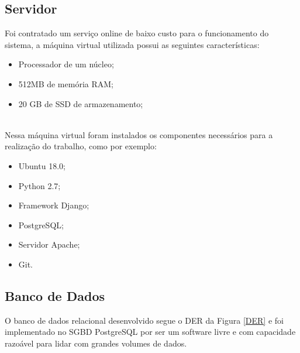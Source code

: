 \subsection{Servidor}
Foi contratado um serviço online de baixo custo para o funcionamento do sistema, a máquina virtual utilizada possui as seguintes características:
\begin{itemize}
  \item Processador de um núcleo;
  \item 512MB de memória RAM;
  \item 20 GB de SSD de armazenamento;
\end{itemize}
\\\null \quad Nessa máquina virtual foram instalados os componentes necessários para a realização do trabalho, como por exemplo:
\begin{itemize}
  \item Ubuntu 18.0;
  \item Python 2.7;
  \item Framework Django;
  \item PostgreSQL;
  \item Servidor Apache;
  \item Git.
\end{itemize}

\subsection{Banco de Dados}
O banco de dados relacional desenvolvido segue o \acrfull{DER} da Figura \ref{DER} e foi implementado no \acrfull{SGBD} PostgreSQL por ser um software livre e com capacidade razoável para lidar com grandes volumes de dados.


